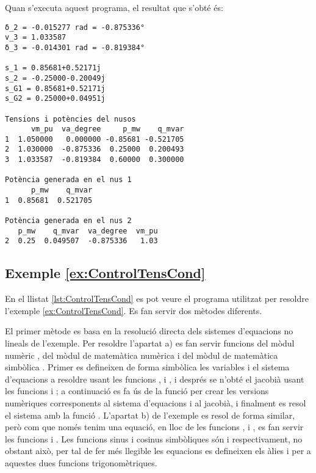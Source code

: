 Quan s'executa aquest programa, el resultat que s'obté és:
\lstset{
	language=,
	numbers=none,
	frame=none
}
\begin{lstlisting}
δ_2 = -0.015277 rad = -0.875336°
v_3 = 1.033587
δ_3 = -0.014301 rad = -0.819384°

s_1 = 0.85681+0.52171j
s_2 = -0.25000-0.20049j
s_G1 = 0.85681+0.52171j
s_G2 = 0.25000+0.04951j

Tensions i potències del nusos
      vm_pu  va_degree     p_mw    q_mvar
1  1.050000   0.000000 -0.85681 -0.521705
2  1.030000  -0.875336  0.25000  0.200493
3  1.033587  -0.819384  0.60000  0.300000

Potència generada en el nus 1
      p_mw    q_mvar
1  0.85681  0.521705

Potència generada en el nus 2
   p_mw    q_mvar  va_degree  vm_pu
2  0.25  0.049507  -0.875336   1.03
\end{lstlisting} 


\hypertarget{exemple:ControlTensCond}{\subsection{Exemple \ref*{ex:ControlTensCond} \ControlTensCond}}
En el llistat \vref{lst:ControlTensCond} es pot veure el programa utilitzat per resoldre l'exemple \vref{ex:ControlTensCond}. Es fan servir dos mètodes diferents.

El primer mètode es basa en la resolució directa dels sistemes d'equacions no lineals de l'exemple. Per resoldre l'apartat a)   es fan servir funcions del mòdul numèric , del mòdul de matemàtica numèrica  i del mòdul de matemàtica simbòlica . Primer es defineixen de forma simbòlica les variables i el sistema d'equacions a resoldre usant les funcions ,  i , i després se n'obté el jacobià usant les funcions  i ; a continuació es fa ús de la funció   per crear les versions numèriques corresponents al sistema d'equacions i al jacobià, i finalment es resol el sistema amb la funció . L'apartat b) de l'exemple es resol de forma similar, però com que només tenim una equació, en lloc de les funcions ,  i , es fan servir les funcions  i . Les funcions sinus i cosinus simbòliques són   i   respectivament, no obstant això,  per tal de fer més llegible les equacions es defineixen els àlies  i  per a aquestes dues funcions trigonomètriques.

